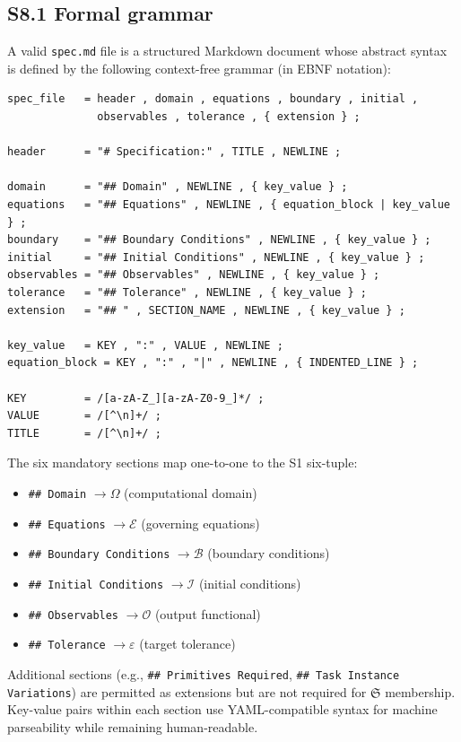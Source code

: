 \documentclass[11pt,a4paper]{article}
\newcommand{\Sclass}{\mathfrak{S}}
\newcommand{\Domain}{\Omega}
\begin{document}
\subsection*{S8.1 Formal grammar}

A valid \texttt{spec.md} file is a structured Markdown document whose abstract syntax is defined by the following context-free grammar (in EBNF notation):

\begin{verbatim}
spec_file   = header , domain , equations , boundary , initial ,
              observables , tolerance , { extension } ;

header      = "# Specification:" , TITLE , NEWLINE ;

domain      = "## Domain" , NEWLINE , { key_value } ;
equations   = "## Equations" , NEWLINE , { equation_block | key_value } ;
boundary    = "## Boundary Conditions" , NEWLINE , { key_value } ;
initial     = "## Initial Conditions" , NEWLINE , { key_value } ;
observables = "## Observables" , NEWLINE , { key_value } ;
tolerance   = "## Tolerance" , NEWLINE , { key_value } ;
extension   = "## " , SECTION_NAME , NEWLINE , { key_value } ;

key_value   = KEY , ":" , VALUE , NEWLINE ;
equation_block = KEY , ":" , "|" , NEWLINE , { INDENTED_LINE } ;

KEY         = /[a-zA-Z_][a-zA-Z0-9_]*/ ;
VALUE       = /[^\n]+/ ;
TITLE       = /[^\n]+/ ;
\end{verbatim}

The six mandatory sections map one-to-one to the S1 six-tuple:
\begin{itemize}[nosep,leftmargin=1.5em]
\item \texttt{\#\# Domain} $\to \Domain$ (computational domain)
\item \texttt{\#\# Equations} $\to \mathcal{E}$ (governing equations)
\item \texttt{\#\# Boundary Conditions} $\to \mathcal{B}$ (boundary conditions)
\item \texttt{\#\# Initial Conditions} $\to \mathcal{I}$ (initial conditions)
\item \texttt{\#\# Observables} $\to \mathcal{O}$ (output functional)
\item \texttt{\#\# Tolerance} $\to \varepsilon$ (target tolerance)
\end{itemize}

Additional sections (e.g., \texttt{\#\# Primitives Required}, \texttt{\#\# Task Instance Variations}) are permitted as extensions but are not required for $\Sclass$ membership. Key-value pairs within each section use YAML-compatible syntax for machine parseability while remaining human-readable.
\end{document}
